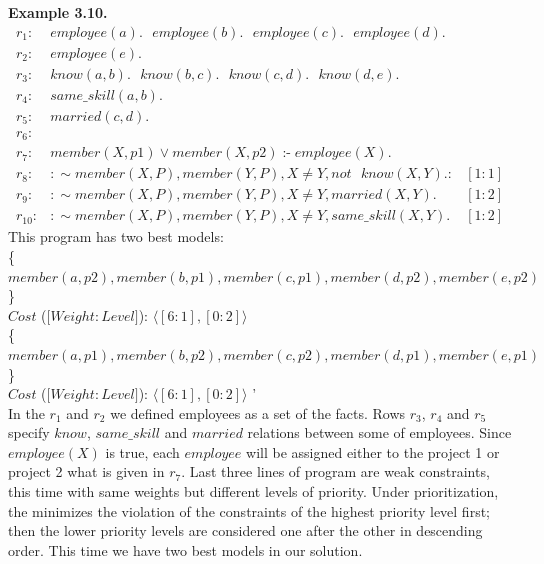 \documentclass[14pt,a4paper, titlepage]{article}
\DeclareMathOperator{\leftimpl}{:-}
\begin{document}
\textbf{Example 3.10.}
\begin{align*}
r_1\colon& \mathit{employee}(a). \text{ } \mathit{employee}(b). \text{ }  \mathit{employee}(c). \text{ } \mathit{employee(d)}. \\
r_2\colon& \mathit{employee}(e). \\
r_3\colon& \mathit{know}(a,b). \text{ } \mathit{know}(b,c). \text{ } \mathit{know}(c,d). \text{ } \mathit{know}(d,e). \\
r_4\colon& \mathit{same\_skill}(a,b). \\
r_5\colon& \mathit{married(c,d)}. \\
r_6\colon&  \\ 
r_7\colon& \mathit{member}(X,p1) \vee \mathit{member}(X,p2) \leftimpl \mathit{employee}(X).\\
r_8\colon& : \sim \mathit{member}(X,P), \mathit{member}(Y,P), X \neq Y, \mathit{not} \text{ } \mathit{know(X,Y)}. \colon& [1:1] \\
r_{9}\colon& : \sim  \mathit{member}(X,P), \mathit{member}(Y,P), X \neq Y, \mathit{marrie}d(X,Y). & [1:2]\\
r_{10}\colon& : \sim member(X,P), member(Y,P), X \neq Y, same\_skill(X,Y). & [1:2] 
\end{align*}
This program has two best models:
\\ \{$\mathit{member}(a,p2), \mathit{member}(b,p1), \mathit{member}(c,p1), \mathit{member}(d,p2), \mathit{member}(e,p2)$\}
\\$\mathit{Cost}$ ($[ \mathit{Weight:Level]}$): $ \langle [6:1],[0:2] \rangle $
\\ \{$\mathit{member}(a,p1), \mathit{member}(b,p2), \mathit{member}(c,p2), \mathit{member}(d,p1), \mathit{member}(e,p1)$\}
\\$\mathit{Cost}$ ($[ \mathit{Weight:Level]}$): $ \langle [6:1],[0:2] \rangle $ '\\

In the $r_1$ and $r_2$ we defined employees as a set of the facts. Rows $r_3$, $r_4$ and $r_5$ specify $\mathit{know}$, $\mathit{same\_skill}$ and $\mathit{married}$ relations between some of employees. Since $\mathit{employee}(X)$ is true, each $\mathit{employee}$ will be assigned either to the project 1 or project 2 what is given in $r_7$. Last three lines of program are weak constraints, this time with same weights but different levels of priority. Under prioritization, the \dlvhex{} minimizes the violation of the constraints of the highest priority level first; then the lower priority levels are considered one after the other in descending order. This time we have two best models in our solution.     
\end{document}
